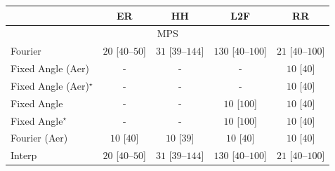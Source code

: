 \begin{tabular}{l|cccc|}
\toprule
            & ER & HH & L2F & RR \\
\midrule
\multicolumn{5}{c}{\rule{0pt}{8pt}MPS} \\
\midrule
Fourier & {\cellcolor[HTML]{F5FBF3}} \color[HTML]{000000} $20$ [$40$--$50$] & {\cellcolor[HTML]{F3FAF0}} \color[HTML]{000000} $31$ [$39$--$144$] & {\cellcolor[HTML]{DAF0D4}} \color[HTML]{000000} $130$ [$40$--$100$] & {\cellcolor[HTML]{F5FBF2}} \color[HTML]{000000} $21$ [$40$--$100$] \\
Fixed Angle (Aer) & {\cellcolor[HTML]{000000}} \color[HTML]{F1F1F1} {\cellcolor{white}} \color{black} - & {\cellcolor[HTML]{000000}} \color[HTML]{F1F1F1} {\cellcolor{white}} \color{black} - & {\cellcolor[HTML]{000000}} \color[HTML]{F1F1F1} {\cellcolor{white}} \color{black} - & {\cellcolor[HTML]{F7FCF5}} \color[HTML]{000000} $10$ [$40$] \\
Fixed Angle (Aer)$^\star$ & {\cellcolor[HTML]{000000}} \color[HTML]{F1F1F1} {\cellcolor{white}} \color{black} - & {\cellcolor[HTML]{000000}} \color[HTML]{F1F1F1} {\cellcolor{white}} \color{black} - & {\cellcolor[HTML]{000000}} \color[HTML]{F1F1F1} {\cellcolor{white}} \color{black} - & {\cellcolor[HTML]{F7FCF5}} \color[HTML]{000000} $10$ [$40$] \\
Fixed Angle & {\cellcolor[HTML]{000000}} \color[HTML]{F1F1F1} {\cellcolor{white}} \color{black} - & {\cellcolor[HTML]{000000}} \color[HTML]{F1F1F1} {\cellcolor{white}} \color{black} - & {\cellcolor[HTML]{F7FCF5}} \color[HTML]{000000} $10$ [$100$] & {\cellcolor[HTML]{F7FCF5}} \color[HTML]{000000} $10$ [$40$] \\
Fixed Angle$^\star$ & {\cellcolor[HTML]{000000}} \color[HTML]{F1F1F1} {\cellcolor{white}} \color{black} - & {\cellcolor[HTML]{000000}} \color[HTML]{F1F1F1} {\cellcolor{white}} \color{black} - & {\cellcolor[HTML]{F7FCF5}} \color[HTML]{000000} $10$ [$100$] & {\cellcolor[HTML]{F7FCF5}} \color[HTML]{000000} $10$ [$40$] \\
Fourier (Aer) & {\cellcolor[HTML]{F7FCF5}} \color[HTML]{000000} $10$ [$40$] & {\cellcolor[HTML]{F7FCF5}} \color[HTML]{000000} $10$ [$39$] & {\cellcolor[HTML]{F7FCF5}} \color[HTML]{000000} $10$ [$40$] & {\cellcolor[HTML]{F7FCF5}} \color[HTML]{000000} $10$ [$40$] \\
Interp & {\cellcolor[HTML]{F5FBF3}} \color[HTML]{000000} $20$ [$40$--$50$] & {\cellcolor[HTML]{F3FAF0}} \color[HTML]{000000} $31$ [$39$--$144$] & {\cellcolor[HTML]{DAF0D4}} \color[HTML]{000000} $130$ [$40$--$100$] & {\cellcolor[HTML]{F5FBF2}} \color[HTML]{000000} $21$ [$40$--$100$] \\

\end{tabular}
